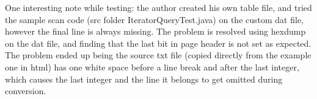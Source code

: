 \documentclass[11pt]{article}
\begin{document}
One interesting note while testing: the author created his own table file, and tried the sample scan code (src folder IteratorQueryTest.java) on the custom dat file, however the final line is always missing. The problem is resolved using hexdump on the dat file, and finding that the last bit in page header is not set as expected. The problem ended up being the source txt file (copied directly from the example one in html) has one white space before a line break and after the last integer, which causes the last integer and the line it belongs to get omitted during conversion.
\end{document}
